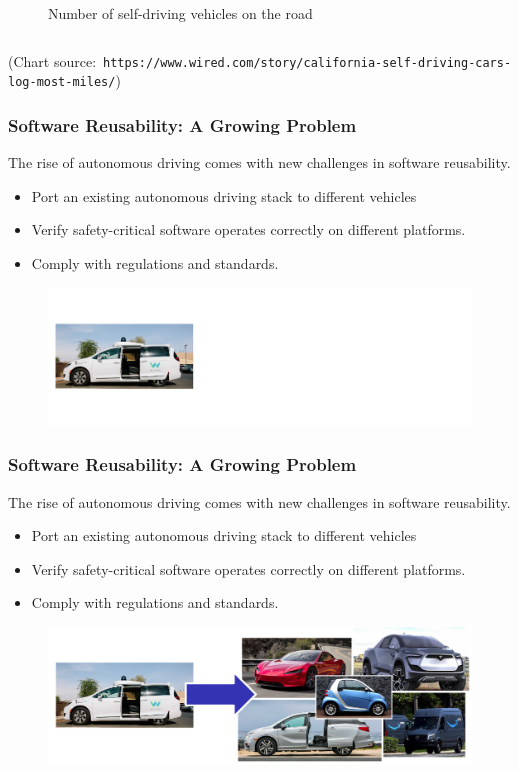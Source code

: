 \documentclass{beamer}
\begin{document}
\begin{frame}
\begin{columns}
\begin{column}{0.45\linewidth}
\begin{figure}
	\caption{Number of self-driving vehicles on the road}
\end{figure}
\end{column}
\end{columns}

\tiny(Chart source:\ \texttt{https://www.wired.com/story/california-self-driving-cars-log-most-miles/})
\normalsize
\end{frame}

\begin{frame}
\frametitle{Software Reusability: A Growing Problem}
The rise of autonomous driving comes with new challenges in software reusability.
\begin{itemize}
	\item Port an existing autonomous driving stack to different vehicles
	\item Verify safety-critical software operates correctly on different platforms.
	\item Comply with regulations and standards.
\end{itemize}
\begin{figure}
	\includegraphics[width=0.9\linewidth]{figures/one.png}
\end{figure}
\end{frame}

\begin{frame}
\frametitle{Software Reusability: A Growing Problem}
The rise of autonomous driving comes with new challenges in software reusability.
\begin{itemize}
	\item Port an existing autonomous driving stack to different vehicles
	\item Verify safety-critical software operates correctly on different platforms.
	\item Comply with regulations and standards.
\end{itemize}
\begin{figure}
	\includegraphics[width=0.9\linewidth]{figures/one_to_many.png}
\end{figure}
\end{frame}
\end{document}
